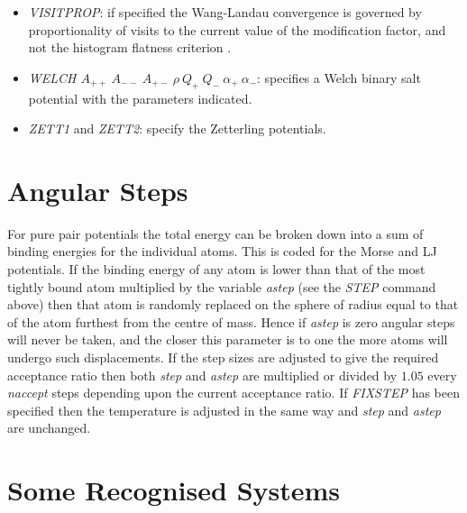 \documentclass[12pt,a4paper,dvips]{article}
\begin{document}
\begin{itemize}
\item {\it VISITPROP}: if specified the Wang-Landau convergence is governed by proportionality of visits to the current value of
the modification factor, and not the histogram flatness criterion \cite{ZhouB03}.

\item {\it WELCH $A_{++}\ A_{--}\ A_{+-}\ \rho\ Q_+\ Q_-\ \alpha_+\ \alpha_-$\/}: specifies a Welch binary
salt potential with the parameters indicated.

\item {\it ZETT1\/} and {\it ZETT2\/}: specify the Zetterling potentials.
\end{itemize}

\section{Angular Steps}

For pure pair potentials the total energy can be broken down into a sum of binding
energies for the individual atoms. This is coded for the Morse and LJ potentials.
If the binding energy of any atom is lower than that of the most tightly bound atom
multiplied by the variable {\it astep\/} (see the {\it STEP\/} command above) then
that atom is randomly replaced on the sphere of radius equal to that of the atom furthest
from the centre of mass. Hence if {\it astep\/} is zero angular steps will never be taken,
and the closer this parameter is to one the more atoms will undergo such displacements.
If the step sizes are adjusted to give the required acceptance ratio then both {\it step\/} and
{\it astep\/} are multiplied or divided by $1.05$ every {\it naccept\/} steps depending
upon the current acceptance ratio. If {\it FIXSTEP\/} has been specified then the temperature
is adjusted in the same way and {\it step\/} and {\it astep\/} are unchanged.

\section{Some Recognised Systems}

%
\end{document}
